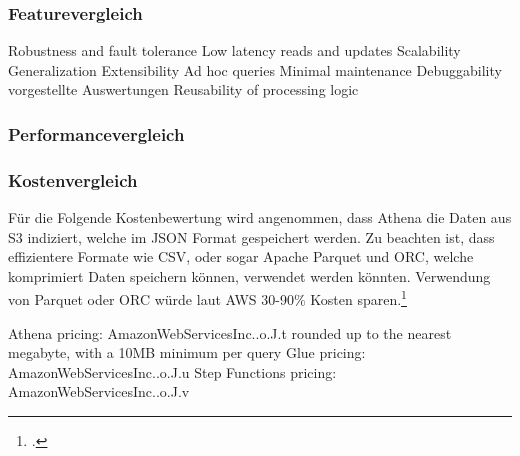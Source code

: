 \subsubsection{Featurevergleich} 
Robustness and fault tolerance
Low latency reads and updates
Scalability
Generalization
Extensibility
Ad hoc queries
Minimal maintenance
Debuggability
vorgestellte Auswertungen 
Reusability of processing logic

\subsubsection{Performancevergleich}

\subsubsection{Kostenvergleich}
Für die Folgende Kostenbewertung wird angenommen, dass Athena die Daten aus S3 indiziert, welche im \ac{JSON} Format gespeichert werden. Zu beachten ist, dass effizientere Formate wie CSV, oder sogar Apache Parquet und ORC, welche komprimiert Daten speichern können, verwendet werden  könnten. Verwendung von Parquet oder ORC würde laut \ac{AWS} 30-90\% Kosten sparen.\footcite[Vgl.][]{AmazonWebServicesInc..o.J.t}

Athena pricing: AmazonWebServicesInc..o.J.t  rounded up to the nearest megabyte, with a 10MB minimum per query
Glue pricing: AmazonWebServicesInc..o.J.u
Step Functions pricing: AmazonWebServicesInc..o.J.v


